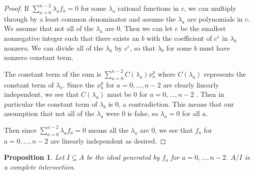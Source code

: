\documentclass{article}
\numberwithin{equation}{section}
\newtheorem{proposition}[equation]{Proposition}
\begin{document}
\begin{proof}
If $\sum_{a=0}^{n-2} \lambda_af_a=0$ for some $\lambda_a$ rational functions in $c$, we can multiply through by a least common denominator and assume the $\lambda_a$ are polynomials in $c$. We assume that not all of the $\lambda_a$ are $0$. Then we can let $e$ be the smallest nonnegative integer such that there exists an $b$ with the coefficient of $c^e$ in $\lambda_b$ nonzero. We can divide all of the $\lambda_a$ by $c^e$, so that $\lambda_b$ for some $b$ must have nonzero constant term.

The constant term of the sum is $\sum_{a=0}^{n-2} C(\lambda_a)x_a^p$ where $C(\lambda_a)$ represents the constant term of $\lambda_a$. Since the $x_a^p$ for $a=0,\dots,n-2$ are clearly linearly independent, we see that $C(\lambda_a)$ must be $0$ for $a=0,\dots,n-2$ . Then in particular the constant term of $\lambda_b$ is $0$, a contradiction. This means that our assumption that not all of the $\lambda_a$ were $0$ is false, so $\lambda_a=0$ for all $a$. 

Then since $\sum_{a=0}^{n-2} \lambda_af_a=0$ means all the $\lambda_a$ are $0$, we see that $f_a$ for $a=0,\dots,n-2$ are linearly independent as desired. 

\end{proof}


\begin{proposition} Let $I \subseteq A$ be the ideal generated by $f_a$ for $a=0,\dots,n-2$. $A/I$ is a complete intersection. 
\end{proposition}
\end{document}
